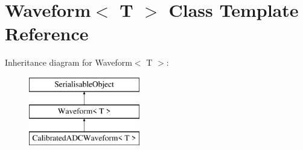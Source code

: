 \hypertarget{classWaveform}{\section{Waveform$<$ T $>$ Class Template Reference}
\label{classWaveform}
}
Inheritance diagram for Waveform$<$ T $>$\-:\begin{figure}[H]
\begin{center}
\leavevmode
\includegraphics[height=3.000000cm]{classWaveform}
\end{center}
\end{figure}
